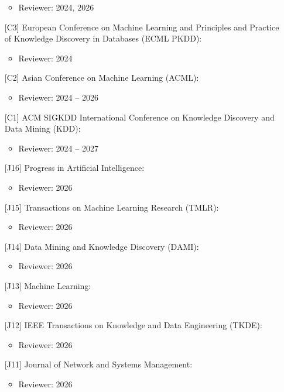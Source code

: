 \documentclass{resume}
\begin{document}
\begin{itemize}[parsep=0.5ex]
\begin{itemize}
    \item Reviewer: 2024, 2026
\end{itemize}
\item [{[C3]}] European Conference on Machine Learning and Principles and Practice of Knowledge Discovery in Databases (ECML PKDD):
\begin{itemize}
    \item Reviewer: 2024
\end{itemize}
\item [{[C2]}] Asian Conference on Machine Learning (ACML): 
\begin{itemize}
    \item Reviewer: 2024 -- 2026
\end{itemize}
\item [{[C1]}] ACM SIGKDD International Conference on Knowledge Discovery and Data Mining (KDD):
\begin{itemize}
    \item Reviewer: 2024 -- 2027
\end{itemize}
\item [{[J16]}] Progress in Artificial Intelligence:
\begin{itemize}
    \item Reviewer: 2026
\end{itemize}
\item [{[J15]}] Transactions on Machine Learning Research (TMLR):
\begin{itemize}
    \item Reviewer: 2026
\end{itemize}
\item [{[J14]}] Data Mining and Knowledge Discovery (DAMI):
\begin{itemize}
    \item Reviewer: 2026
\end{itemize}
\item [{[J13]}] Machine Learning:
\begin{itemize}
    \item Reviewer: 2026
\end{itemize}
\item [{[J12]}] IEEE Transactions on Knowledge and Data Engineering (TKDE):
\begin{itemize}
    \item Reviewer: 2026
\end{itemize}
\item [{[J11]}] Journal of Network and Systems Management:
\begin{itemize}
    \item Reviewer: 2026

\end{itemize}
\end{itemize}
\end{document}
